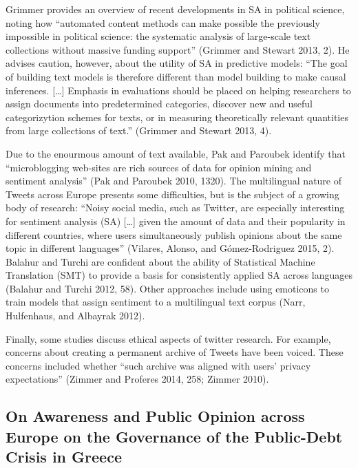 \documentclass[]{article}
\begin{document}
Grimmer provides an overview of recent developments in SA in political
science, noting how ``automated content methods can make possible the
previously impossible in political science: the systematic analysis of
large-scale text collections without massive funding support'' (Grimmer
and Stewart 2013, 2). He advises caution, however, about the utility of
SA in predictive models: ``The goal of building text models is therefore
different than model building to make causal inferences. {[}\ldots{}{]}
Emphasis in evaluations should be placed on helping researchers to
assign documents into predetermined categories, discover new and useful
categorizytion schemes for texts, or in measuring theoretically relevant
quantities from large collections of text.'' (Grimmer and Stewart 2013,
4).

Due to the enourmous amount of text available, Pak and Paroubek identify
that ``microblogging web-sites are rich sources of data for opinion
mining and sentiment analysis'' (Pak and Paroubek 2010, 1320). The
multilingual nature of Tweets across Europe presents some difficulties,
but is the subject of a growing body of research: ``Noisy social media,
such as Twitter, are especially interesting for sentiment analysis (SA)
{[}\ldots{}{]} given the amount of data and their popularity in
different countries, where users simultaneously publish opinions about
the same topic in different languages'' (Vilares, Alonso, and
G{ó}mez-Rodr{i}guez 2015, 2). Balahur and Turchi are confident about the
ability of Statistical Machine Translation (SMT) to provide a basis for
consistently applied SA across languages (Balahur and Turchi 2012, 58).
Other approaches include using emoticons to train models that assign
sentiment to a multilingual text corpus (Narr, Hulfenhaus, and Albayrak
2012).

Finally, some studies discuss ethical aspects of twitter research. For
example, concerns about creating a permanent archive of Tweets have been
voiced. These concerns included whether ``such archive was aligned with
users' privacy expectations'' (Zimmer and Proferes 2014, 258; Zimmer
2010).

\subsection{On Awareness and Public Opinion across Europe on the
Governance of the Public-Debt Crisis in
Greece}\label{on-awareness-and-public-opinion-across-europe-on-the-governance-of-the-public-debt-crisis-in-greece}
\end{document}
